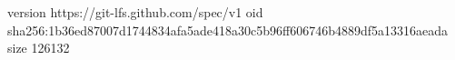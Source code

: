 version https://git-lfs.github.com/spec/v1
oid sha256:1b36ed87007d1744834afa5ade418a30c5b96ff606746b4889df5a13316aeada
size 126132
